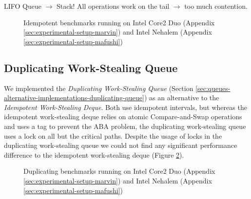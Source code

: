 LIFO Queue $\rightarrow$ Stack! All operations work on the tail
$\rightarrow$ too much contention.

\begin{figure}[!htb]
  \centering
  \caption{Idempotent benchmarks running on Intel Core2 Duo (Appendix
    \ref{sec:experimental-setup-marvin}) and Intel Nehalem (Appendix
    \ref{sec:experimental-setup-mafushi})}
  \label{fig:queues-performance-idempotent}
\end{figure}

\subsection{Duplicating Work-Stealing Queue}
\label{sec:performance-alternative-duplicating}

We implemented the \emph{Duplicating Work-Stealing Queue} (Section
\ref{sec:queues-alternative-implementations-duplicating-queue}) as an
alternative to the \emph{Idempotent Work-Stealing Deque}. Both use
idempotent intervals, but whereas the idempotent work-stealing deque
relies on atomic Compare-and-Swap operations and uses a tag to prevent
the ABA problem, the duplicating work-stealing queue uses a lock on
all but the critical paths. Despite the usage of locks in the
duplicating work-stealing queue we could not find any significant
performance difference to the idempotent work-stealing deque (Figure
\ref{fig:queues-performance-duplicating}).

\begin{figure}[!htb]
  \centering
  \caption{Duplicating benchmarks running on Intel Core2 Duo (Appendix
    \ref{sec:experimental-setup-marvin}) and Intel Nehalem (Appendix
    \ref{sec:experimental-setup-mafushi})}
  \label{fig:queues-performance-duplicating}
\end{figure}

